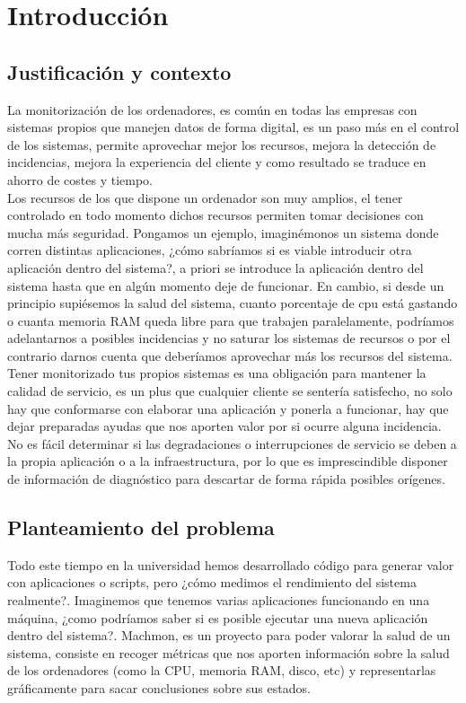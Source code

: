\documentclass[ spanish, a4paper, 12pt, oneside]{report}
\begin{document}
\chapter{Introducción}

\section{Justificación y contexto}


La monitorización de los ordenadores, es común en todas las empresas con sistemas propios que manejen datos de forma 
digital, es un paso más en el control de los sistemas, permite aprovechar mejor los recursos, mejora la detección de incidencias, mejora la experiencia del 
cliente y como resultado se traduce en ahorro de costes y tiempo. \\

Los recursos de los que dispone un ordenador son muy amplios, el tener controlado en todo momento dichos recursos permiten tomar decisiones
con mucha más seguridad. Pongamos un ejemplo, imaginémonos un sistema donde corren distintas aplicaciones, ¿cómo sabríamos si es viable introducir otra 
aplicación dentro del sistema?, a priori se introduce la aplicación dentro del sistema hasta que en algún momento deje de funcionar. 
En cambio, si desde un principio supiésemos la salud del sistema, cuanto porcentaje de cpu está gastando o cuanta memoria RAM queda libre para que trabajen
paralelamente, podríamos adelantarnos a posibles incidencias y no saturar los sistemas de recursos o por el contrario darnos cuenta que deberíamos 
aprovechar más los recursos del sistema.\\

Tener monitorizado tus propios sistemas es una obligación para mantener la calidad de servicio, es un plus que cualquier cliente se sentería satisfecho, no solo hay 
que conformarse con elaborar una aplicación y ponerla a funcionar, hay que dejar preparadas ayudas que nos aporten valor por si ocurre alguna incidencia. No es fácil 
determinar si las degradaciones o interrupciones de servicio se deben a la propia aplicación o a la infraestructura, por lo que es imprescindible disponer de información 
de diagnóstico para descartar de forma rápida posibles orígenes. \\

\section{Planteamiento del problema}
Todo este tiempo en la universidad hemos desarrollado código para generar valor con aplicaciones o scripts, pero ¿cómo medimos 
el rendimiento del sistema realmente?. Imaginemos que tenemos varias aplicaciones funcionando en una máquina, ¿como 
podríamos saber si es posible ejecutar una nueva aplicación dentro del sistema?. Machmon, es un proyecto para poder valorar la salud de 
un sistema, consiste en recoger métricas que nos aporten información sobre la salud de los
ordenadores (como la CPU, memoria RAM, disco, etc) y representarlas gráficamente para sacar conclusiones sobre sus estados. \\
\end{document}
